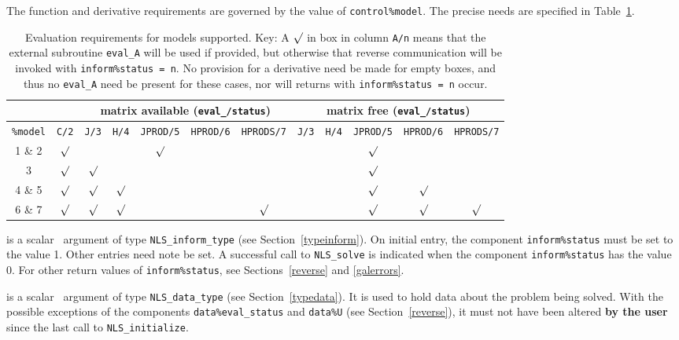 \documentclass{galahad}
\newcommand{\packagename}{NLS}
\begin{document}
\begin{description}
\noindent
The function and derivative requirements are governed by the value of
{\tt control\%model}. The precise needs are specified in Table~\ref{tab-er}.

\begin{table}[h]
\begin{tabular}{|c||c|c|c|c|c|c||c|c|c|c|c|}
\hline
& & \multicolumn{5}{c||}{matrix available ({\tt eval\_/status})}
& \multicolumn{5}{c|}{matrix free ({\tt eval\_/status})} \\
\hline
{\tt \%model}  & {\tt C/2}
 & {\tt J/3} & {\tt H/4} & {\tt JPROD/5} & {\tt HPROD/6} & {\tt HPRODS/7}
 & {\tt J/3} & {\tt H/4} & {\tt JPROD/5} & {\tt HPROD/6} & {\tt HPRODS/7} \\
\hline
1 \& 2 & $\surd$ & & & $\surd$ & & &  & & $\surd$ & & \\
3      & $\surd$ & $\surd$ & & & & &  & & $\surd$ & & \\
\hline
4 \& 5 & $\surd$ & $\surd$ & $\surd$ & & & & & & $\surd$ & $\surd$ & \\
6 \& 7 & $\surd$ & $\surd$ & $\surd$ & & & $\surd$ &
                 & & $\surd$ & $\surd$ & $\surd$ \\
\hline
\end{tabular}
\caption{\label{tab-er} Evaluation requirements for models supported. Key:
A $\surd$ in box in column
{\tt A/n} means that the external subroutine {\tt eval\_A} will be used
if provided, but otherwise that reverse communication will be invoked with
{\tt inform\%status = n}. No provision for a derivative need be made
for empty boxes, and thus no {\tt eval\_A} need be present for these cases,
nor will returns with {\tt inform\%status = n} occur.}
\end{table}

 is a scalar \intentinout\ argument of type
{\tt \packagename\_inform\_type}
(see Section~\ref{typeinform}).
On initial entry, the  component {\tt inform\%status} must be set to the
value 1. Other entries need note be set.
A successful call to
{\tt \packagename\_solve}
is indicated when the  component {\tt inform\%status} has the value 0.
For other return values of {\tt inform\%status}, see
Sections~\ref{reverse} and \ref{galerrors}.

 is a scalar \intentinout\ argument of type
{\tt \packagename\_data\_type}
(see Section~\ref{typedata}). It is used to hold data about the problem being
solved. With the possible exceptions of the components
{\tt data\%eval\_status} and {\tt data\%U} (see Section~\ref{reverse}),
it must not have been altered {\bf by the user} since the last call to
{\tt \packagename\_initialize}.


\end{description}
\end{document}
